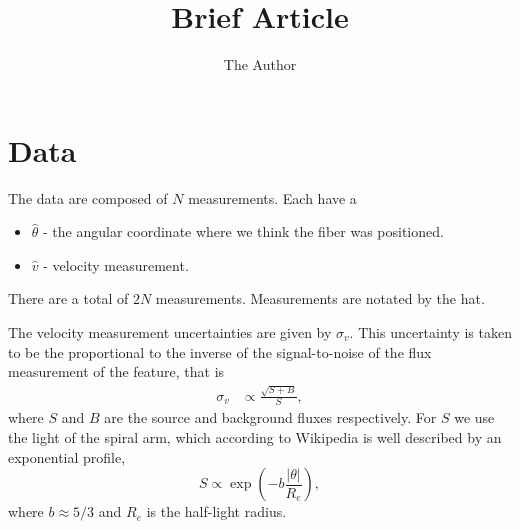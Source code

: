 \documentclass[11pt, oneside]{article}   	%
\title{Brief Article}
\author{The Author}
\begin{document}
\maketitle

\section{Data}
The data are composed of $N$ measurements.  Each have a
\begin{itemize}
\item $\hat{\theta}$ - the angular coordinate where we think the fiber was positioned.
\item $\hat{v}$ - velocity measurement.
\end{itemize}
There are a total of $2N$ measurements.
Measurements are notated by the hat.

The velocity measurement uncertainties are given by $\sigma_v$.  
This uncertainty is taken to be the proportional to the inverse of the signal-to-noise of the flux measurement of the feature, that is
\begin{align*}
\sigma_v & \propto \frac{\sqrt{S + B}}{S},
\end{align*}
where $S$ and $B$ are the source and background fluxes respectively.
For $S$ we use the light of the spiral arm, which according to Wikipedia is well described by an exponential profile,
\begin{equation}
S \propto \exp{\left(-b \frac{|\theta|}{R_e}\right)},
\end{equation}
where $b \approx 5/3$ and $R_e$ is the half-light radius.
\end{document}
